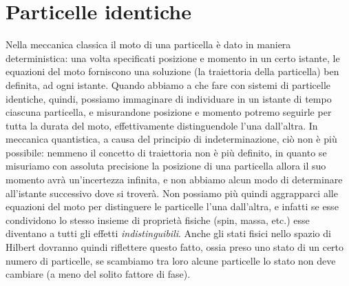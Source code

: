 \section{Particelle identiche}
Nella meccanica classica il moto di una particella è dato in maniera deterministica: una volta specificati posizione e momento in un certo istante, le equazioni del moto forniscono una soluzione (la traiettoria della particella) ben definita, ad ogni istante.
Quando abbiamo a che fare con sistemi di particelle identiche, quindi, possiamo immaginare di individuare in un istante di tempo ciascuna particella, e misurandone posizione e momento potremo seguirle per tutta la durata del moto, effettivamente distinguendole l'una dall'altra.
In meccanica quantistica, a causa del principio di indeterminazione, ciò non è più possibile: nemmeno il concetto di traiettoria non è più definito, in quanto se misuriamo con assoluta precisione la posizione di una particella allora il suo momento avrà un'incertezza infinita, e non abbiamo alcun modo di determinare all'istante successivo dove si troverà.
Non possiamo più quindi aggrapparci alle equazioni del moto per distinguere le particelle l'una dall'altra, e infatti se esse condividono lo stesso insieme di proprietà fisiche (spin, massa, etc.) esse diventano a tutti gli effetti \emph{indistinguibili}.
Anche gli stati fisici nello spazio di Hilbert dovranno quindi riflettere questo fatto, ossia preso uno stato di un certo numero di particelle, se scambiamo tra loro alcune particelle lo stato non deve cambiare (a meno del solito fattore di fase).


